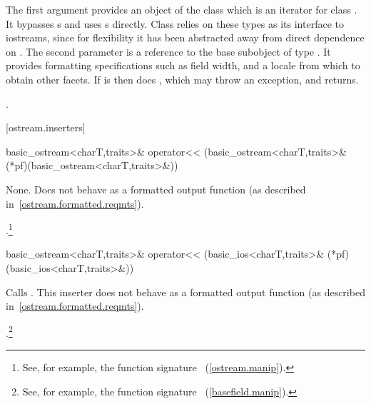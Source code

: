 \begin{itemdescr}
\pnum
The first argument provides an object of the
class which is an iterator for class .
It bypasses
s
and uses
s
directly.
Class
relies on these types as its
interface to iostreams, since for flexibility it has been abstracted
away from direct dependence on
.
The second parameter is a reference to the base subobject of type
.
It provides formatting specifications such as field width, and
a locale from which to obtain other facets.
If
is
then does
,
which may throw an exception, and returns.

\pnum
\returns
{}.
\end{itemdescr}

[ostream.inserters]{}

%
\begin{itemdecl}
basic_ostream<charT,traits>& operator<<
    (basic_ostream<charT,traits>& (*pf)(basic_ostream<charT,traits>&))
\end{itemdecl}

\begin{itemdescr}
\pnum
\effects
None.
Does not behave as a formatted output function (as described
in~\ref{ostream.formatted.reqmts}).

\pnum
\returns
{}.\footnote{See, for example, the function signature
%
~(\ref{ostream.manip}).}
\end{itemdescr}

%
%
\begin{itemdecl}
basic_ostream<charT,traits>& operator<<
    (basic_ios<charT,traits>& (*pf)(basic_ios<charT,traits>&))
\end{itemdecl}

\begin{itemdescr}
\pnum
\effects
Calls
.
This inserter does not
behave as a formatted output function (as described in~\ref{ostream.formatted.reqmts}).

\pnum
\returns
{}.\footnote{See, for example, the function signature
%
~(\ref{basefield.manip}).}
\end{itemdescr}

